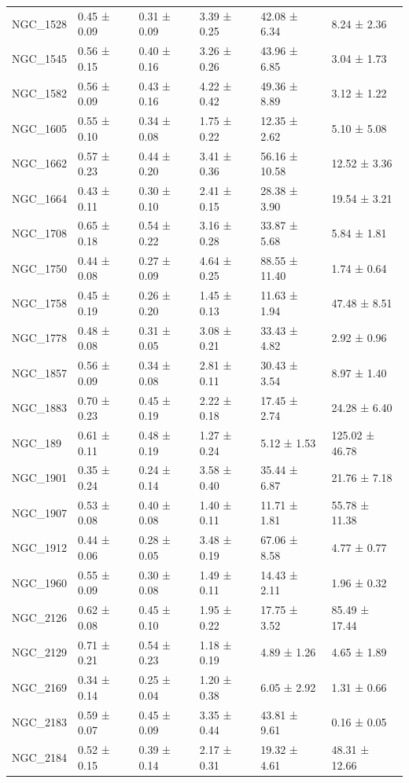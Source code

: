 \begin{tabular}{llllll}
NGC_1528 & 0.45 ± 0.09 & 0.31 ± 0.09 & 3.39 ± 0.25 & 42.08 ± 6.34 & 8.24 ± 2.36 \\
NGC_1545 & 0.56 ± 0.15 & 0.40 ± 0.16 & 3.26 ± 0.26 & 43.96 ± 6.85 & 3.04 ± 1.73 \\
NGC_1582 & 0.56 ± 0.09 & 0.43 ± 0.16 & 4.22 ± 0.42 & 49.36 ± 8.89 & 3.12 ± 1.22 \\
NGC_1605 & 0.55 ± 0.10 & 0.34 ± 0.08 & 1.75 ± 0.22 & 12.35 ± 2.62 & 5.10 ± 5.08 \\
NGC_1662 & 0.57 ± 0.23 & 0.44 ± 0.20 & 3.41 ± 0.36 & 56.16 ± 10.58 & 12.52 ± 3.36 \\
NGC_1664 & 0.43 ± 0.11 & 0.30 ± 0.10 & 2.41 ± 0.15 & 28.38 ± 3.90 & 19.54 ± 3.21 \\
NGC_1708 & 0.65 ± 0.18 & 0.54 ± 0.22 & 3.16 ± 0.28 & 33.87 ± 5.68 & 5.84 ± 1.81 \\
NGC_1750 & 0.44 ± 0.08 & 0.27 ± 0.09 & 4.64 ± 0.25 & 88.55 ± 11.40 & 1.74 ± 0.64 \\
NGC_1758 & 0.45 ± 0.19 & 0.26 ± 0.20 & 1.45 ± 0.13 & 11.63 ± 1.94 & 47.48 ± 8.51 \\
NGC_1778 & 0.48 ± 0.08 & 0.31 ± 0.05 & 3.08 ± 0.21 & 33.43 ± 4.82 & 2.92 ± 0.96 \\
NGC_1857 & 0.56 ± 0.09 & 0.34 ± 0.08 & 2.81 ± 0.11 & 30.43 ± 3.54 & 8.97 ± 1.40 \\
NGC_1883 & 0.70 ± 0.23 & 0.45 ± 0.19 & 2.22 ± 0.18 & 17.45 ± 2.74 & 24.28 ± 6.40 \\
NGC_189 & 0.61 ± 0.11 & 0.48 ± 0.19 & 1.27 ± 0.24 & 5.12 ± 1.53 & 125.02 ± 46.78 \\
NGC_1901 & 0.35 ± 0.24 & 0.24 ± 0.14 & 3.58 ± 0.40 & 35.44 ± 6.87 & 21.76 ± 7.18 \\
NGC_1907 & 0.53 ± 0.08 & 0.40 ± 0.08 & 1.40 ± 0.11 & 11.71 ± 1.81 & 55.78 ± 11.38 \\
NGC_1912 & 0.44 ± 0.06 & 0.28 ± 0.05 & 3.48 ± 0.19 & 67.06 ± 8.58 & 4.77 ± 0.77 \\
NGC_1960 & 0.55 ± 0.09 & 0.30 ± 0.08 & 1.49 ± 0.11 & 14.43 ± 2.11 & 1.96 ± 0.32 \\
NGC_2126 & 0.62 ± 0.08 & 0.45 ± 0.10 & 1.95 ± 0.22 & 17.75 ± 3.52 & 85.49 ± 17.44 \\
NGC_2129 & 0.71 ± 0.21 & 0.54 ± 0.23 & 1.18 ± 0.19 & 4.89 ± 1.26 & 4.65 ± 1.89 \\
NGC_2169 & 0.34 ± 0.14 & 0.25 ± 0.04 & 1.20 ± 0.38 & 6.05 ± 2.92 & 1.31 ± 0.66 \\
NGC_2183 & 0.59 ± 0.07 & 0.45 ± 0.09 & 3.35 ± 0.44 & 43.81 ± 9.61 & 0.16 ± 0.05 \\
NGC_2184 & 0.52 ± 0.15 & 0.39 ± 0.14 & 2.17 ± 0.31 & 19.32 ± 4.61 & 48.31 ± 12.66 \\

\end{tabular}
